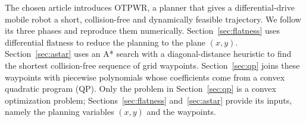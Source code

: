 
The chosen article introduces OTPWR, a planner that gives a differential-drive mobile robot a short, collision-free and dynamically feasible trajectory. We follow its three phases and reproduce them numerically. Section~\ref{sec:flatness} uses differential flatness to reduce the planning to the plane $(x,y)$. Section~\ref{sec:astar} uses an A* search with a diagonal-distance heuristic to find the shortest collision-free sequence of grid waypoints. Section~\ref{sec:qp} joins these waypoints with piecewise polynomials whose coefficients come from a convex quadratic program (QP). Only the problem in Section~\ref{sec:qp} is a convex optimization problem; Sections~\ref{sec:flatness} and~\ref{sec:astar} provide its inputs, namely the planning variables $(x,y)$ and the waypoints.

